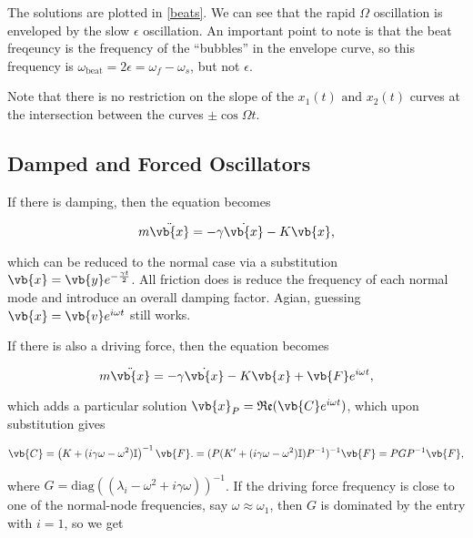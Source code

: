 \documentclass[a4paper,12pt]{report}
\begin{document}
The solutions are plotted in \cref{beats}. We can see that the rapid \(\Omega \) oscillation is enveloped by the slow \(\epsilon \) oscillation. An important point to note is that the beat freqeuncy is the frequency of the ``bubbles'' in the envelope curve, so this frequency is \(\omega _{\text{beat} } = 2 \epsilon = \omega _{f}-\omega _{s}  \), but not \(\epsilon \).    


Note that there is no restriction on the slope of the \(x_1 (t) \text { and } x_2 (t)\) curves at the intersection between the curves \(\pm \cos \Omega t\). 

\subsection{Damped and Forced Oscillators}

If there is damping, then the equation becomes 

\begin{equation}
    m \ddot{\vb{x} } = -\gamma \dot{\vb{x} }-K\vb{x},  
\end{equation}

which can be reduced to the normal case via a substitution \(\vb{x} = \vb{y} e^{-\frac{\gamma t}{2} } \). All friction does is reduce the frequency of each normal mode and introduce an overall damping factor. Agian, guessing \(\vb{x} = \vb{v} e^{i \omega t} \) still works. 

If there is also a driving force, then the equation becomes

\begin{equation}
    m \ddot{\vb{x} } = -\gamma \dot{\vb{x} } - K\vb{x} + \vb{F} e^{i \omega t} ,  
\end{equation}

which adds a particular solution \(\vb{x}_{P}  = \mathfrak{Re} (\vb{C} e^{i \omega t} ) \), which upon substitution gives 

\begin{equation}
    \vb{C} = \left( K+(i \gamma \omega -\omega ^2)\mathbb{I} \right)^{-1} \vb{F}. = (P(K' + (i \gamma \omega - \omega ^2)\mathbb{I})P^{-1} )^{-1} \vb{F} = PGP^{-1} \vb{F} ,
\end{equation}

where \(G = \text{diag}((\lambda _{i} - \omega ^2+i \gamma \omega  ))^{-1}  \). If the driving force frequency is close to one of the normal-node frequencies, say \(\omega \approx \omega _{1} \), then \(G\) is dominated by the entry with \(i = 1\), so we get 
\end{document}
